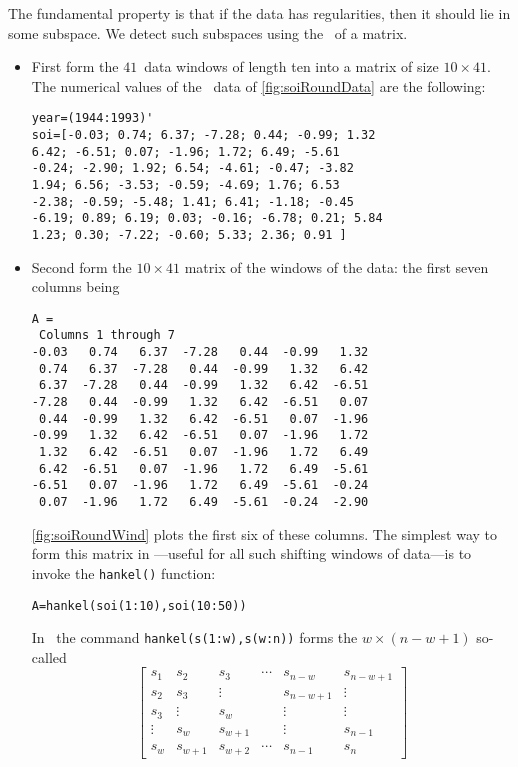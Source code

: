 \begin{example}
The fundamental property is that if the data has regularities, then it should lie in some subspace.
We detect such subspaces using the \svd\ of a matrix.
\begin{itemize}
\item First form the \(41\)~data windows of length ten into a matrix of size \(10\times 41\).
The numerical values of the \soi\ data of \autoref{fig:soiRoundData} are the following:
\begin{verbatim}
year=(1944:1993)'
soi=[-0.03; 0.74; 6.37; -7.28; 0.44; -0.99; 1.32
6.42; -6.51; 0.07; -1.96; 1.72; 6.49; -5.61
-0.24; -2.90; 1.92; 6.54; -4.61; -0.47; -3.82
1.94; 6.56; -3.53; -0.59; -4.69; 1.76; 6.53
-2.38; -0.59; -5.48; 1.41; 6.41; -1.18; -0.45
-6.19; 0.89; 6.19; 0.03; -0.16; -6.78; 0.21; 5.84
1.23; 0.30; -7.22; -0.60; 5.33; 2.36; 0.91 ] 
\end{verbatim}

\item Second form the \(10\times41\) matrix of the windows of the data: the first seven columns being
\begin{verbatim}
A =
 Columns 1 through 7
-0.03   0.74   6.37  -7.28   0.44  -0.99   1.32
 0.74   6.37  -7.28   0.44  -0.99   1.32   6.42
 6.37  -7.28   0.44  -0.99   1.32   6.42  -6.51
-7.28   0.44  -0.99   1.32   6.42  -6.51   0.07
 0.44  -0.99   1.32   6.42  -6.51   0.07  -1.96
-0.99   1.32   6.42  -6.51   0.07  -1.96   1.72
 1.32   6.42  -6.51   0.07  -1.96   1.72   6.49
 6.42  -6.51   0.07  -1.96   1.72   6.49  -5.61
-6.51   0.07  -1.96   1.72   6.49  -5.61  -0.24
 0.07  -1.96   1.72   6.49  -5.61  -0.24  -2.90
\end{verbatim}
\autoref{fig:soiRoundWind} plots the first six of these columns.
The simplest way to form this matrix in \script---useful for all such shifting windows of data---is to invoke the \verb|hankel()| function:
\begin{verbatim}
A=hankel(soi(1:10),soi(10:50))
\end{verbatim}
In \script\ the command \verb|hankel(s(1:w),s(w:n))| forms the \(w\times(n-w+1)\) so-called 
\begin{equation*}
\begin{bmatrix} s_1&s_2&s_3&\cdots&s_{n-w}&s_{n-w+1}
\\s_2&s_3&\vdots&&s_{n-w+1}&\vdots
\\s_3&\vdots&s_w&&\vdots&\vdots
\\\vdots&s_w&s_{w+1}&&\vdots&s_{n-1}
\\s_w&s_{w+1}&s_{w+2}&\cdots&s_{n-1}&s_n \end{bmatrix}
\end{equation*}


\end{itemize}
\end{example}
